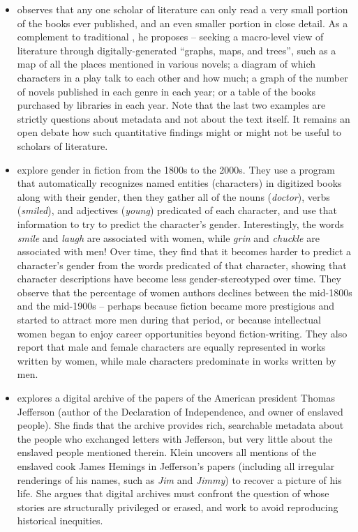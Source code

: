 \begin{itemize}

\item \citet{Moretti:2013} observes that any one scholar of literature
can only read a very small portion of the books ever published, and an
even smaller portion in close detail.  As a complement to traditional
, he proposes  --
seeking a macro-level view of literature through digitally-generated
``graphs, maps, and trees'', such as a map of all the places mentioned
in various novels; a diagram of which characters in a play talk to
each other and how much; a graph of the number of novels published in
each genre in each year; or a table of the books purchased by
libraries in each year. Note that the last two examples are strictly
questions about metadata and not about the text itself.  It remains an open debate how such quantitative findings might or might not be useful to scholars of literature.

\item \citet{Underwood-etal:2018} explore gender in fiction from the
1800s to the 2000s.  They use a program that automatically recognizes
named entities (characters) in digitized books along with their
gender, then they gather all of the nouns (\textit{doctor}), verbs
(\textit{smiled}), and adjectives (\textit{young}) predicated of each
character, and use that information to try to predict the character's
gender. Interestingly, the words \textit{smile} and \textit{laugh} are
associated with women, while \textit{grin} and \textit{chuckle} are
associated with men! Over time, they find that it becomes harder to
predict a character's gender from the words predicated of that
character, showing that character descriptions have become less
gender-stereotyped over time.
They observe that the percentage of women authors declines between
the mid-1800s and the mid-1900s -- perhaps because fiction became more
prestigious and started to attract more men during that period, or
because intellectual women began to enjoy career opportunities beyond
fiction-writing.  They also report that male and female characters are
equally represented in works written by women, while male characters
predominate in works written by men.

\item \citet{Klein:2013} explores a digital archive of the papers of
the American president Thomas Jefferson (author of the Declaration of
Independence, and owner of enslaved people).  She finds that the
archive provides rich, searchable metadata about the people who
exchanged letters with Jefferson, but very little about the enslaved
people mentioned therein.  Klein uncovers all mentions of the enslaved
cook James Hemings in Jefferson's papers (including all irregular
renderings of his names, such as \textit{Jim} and \textit{Jimmy}) to
recover a picture of his life.  She argues that digital archives must
confront the question of whose stories are structurally privileged or
erased, and work to avoid reproducing historical inequities.
\end{itemize}

